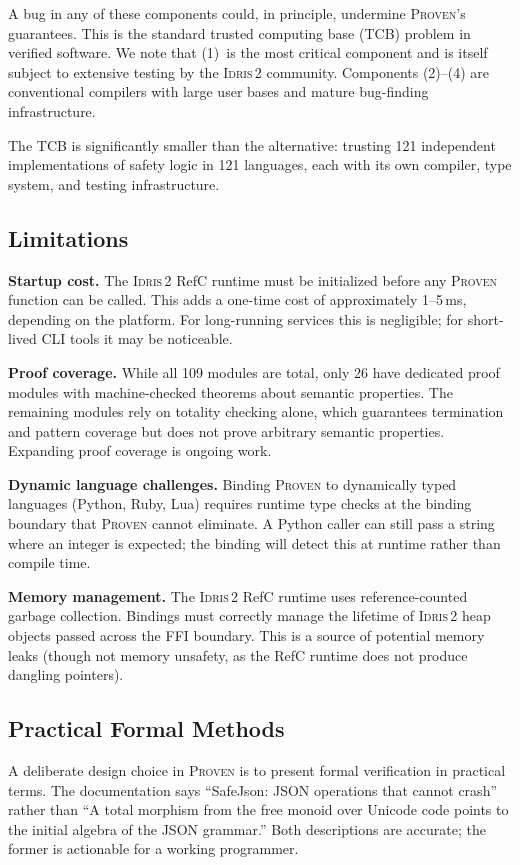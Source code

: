 \documentclass[11pt,a4paper]{article}
\newcommand{\proven}{\textsc{Proven}}
\newcommand{\idris}{\textsc{Idris\,2}}
\begin{document}
A bug in any of these components could, in principle, undermine
\proven{}'s guarantees. This is the standard trusted computing base (TCB)
problem in verified software. We note that (1)~is the most critical
component and is itself subject to extensive testing by the \idris{}
community. Components (2)--(4) are conventional compilers with large user
bases and mature bug-finding infrastructure.

The TCB is significantly smaller than the alternative: trusting 121
independent implementations of safety logic in 121 languages, each with
its own compiler, type system, and testing infrastructure.

\subsection{Limitations}

\textbf{Startup cost.} The \idris{} RefC runtime must be initialized
before any \proven{} function can be called. This adds a one-time cost
of approximately 1--5\,ms, depending on the platform. For long-running
services this is negligible; for short-lived CLI tools it may be
noticeable.

\textbf{Proof coverage.} While all 109 modules are total, only 26 have
dedicated proof modules with machine-checked theorems about semantic
properties. The remaining modules rely on totality checking alone, which
guarantees termination and pattern coverage but does not prove arbitrary
semantic properties. Expanding proof coverage is ongoing work.

\textbf{Dynamic language challenges.} Binding \proven{} to dynamically
typed languages (Python, Ruby, Lua) requires runtime type checks at the
binding boundary that \proven{} cannot eliminate. A Python caller can
still pass a string where an integer is expected; the binding will detect
this at runtime rather than compile time.

\textbf{Memory management.} The \idris{} RefC runtime uses
reference-counted garbage collection. Bindings must correctly manage the
lifetime of \idris{} heap objects passed across the FFI boundary. This
is a source of potential memory leaks (though not memory unsafety, as
the RefC runtime does not produce dangling pointers).

\subsection{Practical Formal Methods}

A deliberate design choice in \proven{} is to present formal verification
in practical terms. The documentation says ``SafeJson: JSON operations
that cannot crash'' rather than ``A total morphism from the free monoid
over Unicode code points to the initial algebra of the JSON grammar.''
Both descriptions are accurate; the former is actionable for a working
programmer.
\end{document}
